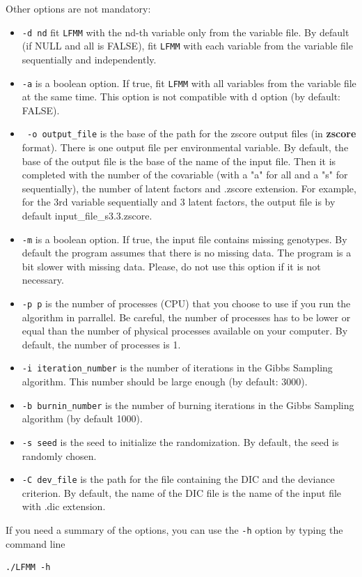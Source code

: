 \documentclass[10pt,a4paper]{article}
\begin{document}
\noindent
Other options are not mandatory:
\begin{itemize}
\item \verb|-d nd| fit {\tt LFMM} with the nd-th variable only from the variable file. By default (if NULL and all is FALSE), fit {\tt LFMM} with each variable from the variable file sequentially and independently.
\item \verb|-a| is a boolean option. If true, fit {\tt LFMM} with all variables from the variable file at the same time. This option is not compatible with d option (by default: FALSE).
\item \verb| -o output_file| is the base of the path for the zscore output files (in {\bf zscore} format). There is one output file per environmental variable. By default, the base of the output file is the base of the name of the input file. Then it is completed with the number of the covariable (with a "a" for all and a "s" for sequentially), the number of latent factors and .zscore extension. For example, for the 3rd variable sequentially and 3 latent factors, the output file is by default input\_file\_s3.3.zscore.
\item \verb|-m| is a boolean option. If true, the input file contains missing genotypes. By default the program assumes that there is no missing data. The program is a bit slower with missing data. Please, do not use this option if it is not necessary.
\item \verb|-p p| is the number of processes (CPU) that you choose to use if you run the algorithm in 
parrallel. Be careful, the number of processes has to be lower or equal than the number of physical 
processes available on your computer. By default, the number of processes is 1.
\item \verb|-i iteration_number| is the number of iterations in the Gibbs Sampling algorithm. This number
should be large enough (by default: 3000).
\item \verb|-b burnin_number| is the number of burning iterations in the Gibbs Sampling algorithm (by default 1000). 
\item \verb|-s seed| is the seed to initialize the randomization. By default, the seed is randomly chosen.
\item \verb|-C dev_file| is the path for the file containing the DIC and the deviance criterion. By default, the name of the DIC file is the name of the input file with .dic extension. 
\end{itemize}

\noindent
If you need a summary of the options, you can use the \verb|-h| option by typing the command line
\footnotesize
\begin{Verbatim}[frame=single]
./LFMM -h
\end{Verbatim}
\noindent
\normalsize
\end{document}
